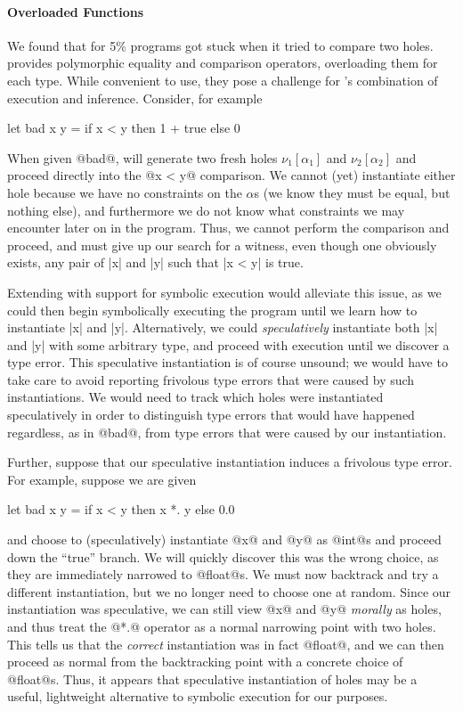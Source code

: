 \paragraph{Overloaded Functions}
%
We found that for 5\% programs \toolname got stuck when it tried to
compare two holes.
%
\ocaml provides polymorphic equality and comparison operators,
overloading them for each type.
%
While convenient to use, they pose a challenge for \toolname's
combination of execution and inference.
%
Consider, for example
%
\begin{code}
  let bad x y =
    if x < y then
      1 + true
    else
      0
\end{code}
%
When given @bad@, \toolname will generate two fresh holes
$\nu_1[\alpha_1]$ and $\nu_2[\alpha_2]$ and proceed directly into the
@x < y@ comparison.
%
We cannot (yet) instantiate either hole because we have no constraints
on the $\alpha$s (we know they must be equal, but nothing else), and
furthermore we do not know what constraints we may encounter later on in
the program.
%
Thus, we cannot perform the comparison and proceed, and must give up our
search for a witness, even though one obviously exists, any pair of |x|
and |y| such that |x < y| is true.

Extending \toolname with support for symbolic execution would alleviate
this issue, as we could then begin symbolically executing the program
until we learn how to instantiate |x| and |y|.
%
Alternatively, we could \emph{speculatively} instantiate both |x| and
|y| with some arbitrary type, and proceed with execution until we
discover a type error.
%
This speculative instantiation is of course unsound; we would have to
take care to avoid reporting frivolous type errors that were caused by
such instantiations.
%
We would need to track which holes were instantiated speculatively in
order to distinguish type errors that would have happened regardless, as
in @bad@, from type errors that were caused by our instantiation.

Further, suppose that our speculative instantiation induces a frivolous
type error.
%
For example, suppose we are given \pagebreak
%
\begin{code}
  let bad x y =
    if x < y then
      x *. y
    else
      0.0
\end{code}
%
and choose to (speculatively) instantiate @x@ and @y@ as @int@s and proceed
down the ``true'' branch.
%
We will quickly discover this was the wrong choice, as they are immediately
narrowed to @float@s.
%
We must now backtrack and try a different instantiation, but we no
longer need to choose one at random.
%
Since our instantiation was speculative, we can still view @x@ and @y@
\emph{morally} as holes, and thus treat the @*.@ operator as a normal
narrowing point with two holes.
%
This tells us that the \emph{correct} instantiation was in fact @float@,
and we can then proceed as normal from the backtracking point with a
concrete choice of @float@s.
%
Thus, it appears that speculative instantiation of holes may be a
useful, lightweight alternative to symbolic execution for our purposes.

